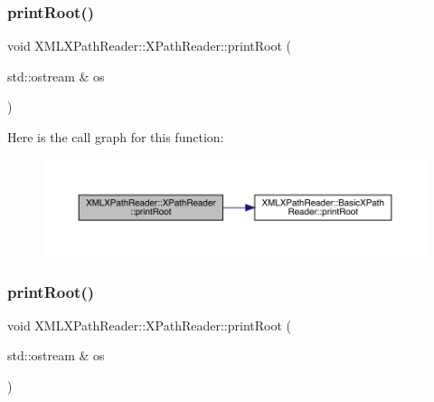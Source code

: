\subsubsection{\texorpdfstring{printRoot()}{printRoot()}\hspace{0.1cm}{\footnotesize\ttfamily [1/3]}}
{\footnotesize\ttfamily void X\+M\+L\+X\+Path\+Reader\+::\+X\+Path\+Reader\+::print\+Root (\begin{DoxyParamCaption}\item[{std\+::ostream \&}]{os }\end{DoxyParamCaption})\hspace{0.3cm}{\ttfamily [inline]}}

Here is the call graph for this function\+:
\nopagebreak
\begin{figure}[H]
\begin{center}
\leavevmode
\includegraphics[width=350pt]{d3/d5a/classXMLXPathReader_1_1XPathReader_a9634a8955fc1b2c8bc086b95f7fa2c1f_cgraph}
\end{center}
\end{figure}
\mbox{\label{classXMLXPathReader_1_1XPathReader_a9634a8955fc1b2c8bc086b95f7fa2c1f}} 
\subsubsection{\texorpdfstring{printRoot()}{printRoot()}\hspace{0.1cm}{\footnotesize\ttfamily [2/3]}}
{\footnotesize\ttfamily void X\+M\+L\+X\+Path\+Reader\+::\+X\+Path\+Reader\+::print\+Root (\begin{DoxyParamCaption}\item[{std\+::ostream \&}]{os }\end{DoxyParamCaption})\hspace{0.3cm}{\ttfamily [inline]}}

